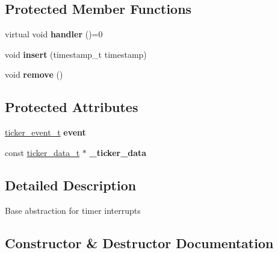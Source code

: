 \subsection*{Protected Member Functions}
\begin{DoxyCompactItemize}
\item 
virtual void {\bfseries handler} ()=0\hypertarget{classmbed_1_1_timer_event_ae3e8dbec184090a2d8f9378773bcbc85}{}\label{classmbed_1_1_timer_event_ae3e8dbec184090a2d8f9378773bcbc85}

\item 
void {\bfseries insert} (timestamp\+\_\+t timestamp)\hypertarget{classmbed_1_1_timer_event_a563aecee58f1db32bb70199952fd81d7}{}\label{classmbed_1_1_timer_event_a563aecee58f1db32bb70199952fd81d7}

\item 
void {\bfseries remove} ()\hypertarget{classmbed_1_1_timer_event_ac8dddb3d9affcc3267e910fb305d956f}{}\label{classmbed_1_1_timer_event_ac8dddb3d9affcc3267e910fb305d956f}

\end{DoxyCompactItemize}
\subsection*{Protected Attributes}
\begin{DoxyCompactItemize}
\item 
\hyperlink{structticker__event__s}{ticker\+\_\+event\+\_\+t} {\bfseries event}\hypertarget{classmbed_1_1_timer_event_a80ea97a2c88250aa898f4adda12a9228}{}\label{classmbed_1_1_timer_event_a80ea97a2c88250aa898f4adda12a9228}

\item 
const \hyperlink{structticker__data__t}{ticker\+\_\+data\+\_\+t} $\ast$ {\bfseries \+\_\+ticker\+\_\+data}\hypertarget{classmbed_1_1_timer_event_acc2c35b1cf2900aa08357b1a2a64db02}{}\label{classmbed_1_1_timer_event_acc2c35b1cf2900aa08357b1a2a64db02}

\end{DoxyCompactItemize}


\subsection{Detailed Description}
Base abstraction for timer interrupts 

\subsection{Constructor \& Destructor Documentation}
